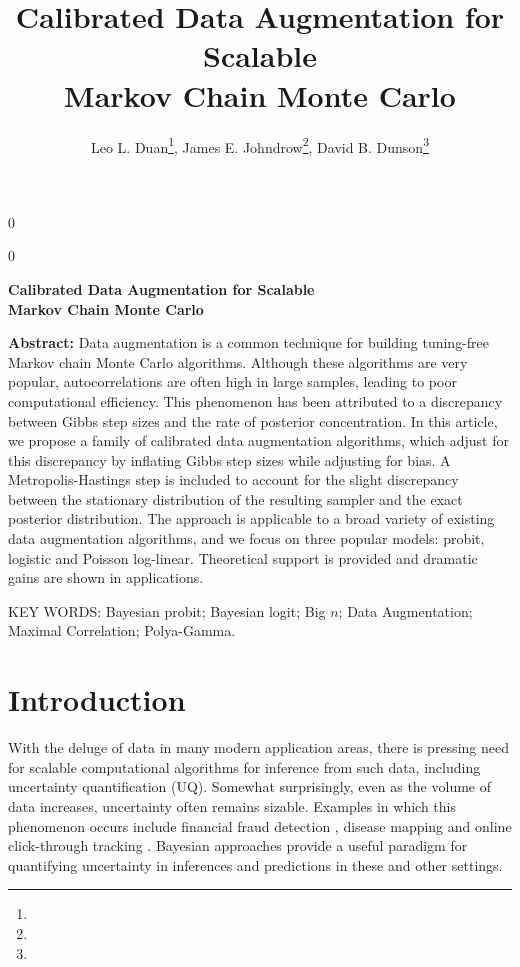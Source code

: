 \documentclass[12pt]{article}
\newcommand{\blind}{0}
\begin{document}
\def\spacingset#1{\renewcommand{\baselinestretch}%
{#1}\small\normalsize} \spacingset{1}

\blind
{
  \title{\bf Calibrated Data Augmentation for Scalable \\ Markov Chain Monte Carlo}
  \author{ Leo L. Duan\thanks{},
     James E. Johndrow\thanks{},
     David B. Dunson\thanks{}}
  \maketitle
} \fi

\blind
{
  \bigskip
  \bigskip
  \bigskip
  \begin{center}
    {\LARGE\bf Calibrated Data Augmentation for Scalable \\ Markov Chain Monte Carlo}
\end{center}
  \medskip
} \fi

{\bf Abstract:} Data augmentation is a common technique for building tuning-free Markov chain Monte Carlo algorithms. Although these algorithms are very popular, 
autocorrelations are often high in large samples, leading to poor computational efficiency.  This phenomenon has been attributed to a discrepancy between Gibbs step sizes and the rate of posterior concentration.  In this article, we propose a family of calibrated data augmentation algorithms, which adjust for this discrepancy by inflating Gibbs step sizes  while adjusting for bias.  A Metropolis-Hastings step is included to account for the slight discrepancy between the stationary distribution of the resulting sampler and the exact posterior distribution.  The approach is applicable to a broad variety of existing data augmentation algorithms, and we focus on three popular models: probit, logistic and Poisson log-linear.  Theoretical support is provided and dramatic gains are shown in applications.
\vskip 12pt

{\noindent  KEY WORDS:  Bayesian probit; Bayesian logit; Big $n$; Data Augmentation; Maximal Correlation; Polya-Gamma.}

\vfill

\newpage
\spacingset{1.45} %



\section{Introduction}

With the deluge of data in many modern application areas, there is pressing need for scalable computational algorithms for inference from such data, including uncertainty quantification (UQ).  Somewhat surprisingly, even as the volume of data increases, uncertainty often remains sizable.  Examples in which this phenomenon occurs include financial fraud detection \citep{ngai2011application}, disease mapping \citep{wakefield2007disease} and online click-through tracking \citep{wang2010click}.  Bayesian approaches provide a useful paradigm for quantifying uncertainty in inferences and predictions in these and other settings.
\end{document}
